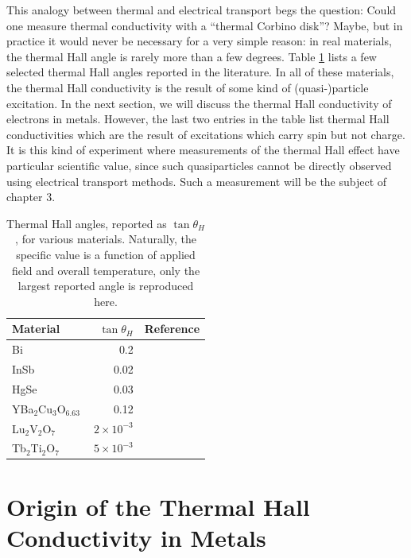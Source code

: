 \documentclass{thesis-umich}
\begin{document}
This analogy between thermal and electrical transport begs the question: Could
one measure thermal conductivity with a ``thermal Corbino disk''? Maybe, but in
practice it would never be necessary for a very simple reason: in real
materials, the thermal Hall angle is rarely more than a few degrees. Table
\ref{tab:hall_angles} lists a few selected thermal Hall angles reported in the
literature. In all of these materials, the thermal Hall conductivity is the
result of some kind of (quasi-)particle excitation. In the next section, we
will discuss the thermal Hall conductivity of electrons in metals. However, the
last two entries in the table list thermal Hall conductivities which are the
result of excitations which carry spin but not charge. It is this kind of
experiment where measurements of the thermal Hall effect have particular
scientific value, since such quasiparticles cannot be directly observed using
electrical transport methods. Such a measurement will be the subject of chapter
3.

\begin{table}
\centering
\label{tab:hall_angles}
\begin{tabular}{l|r|c}
\hline
Material & $\tan \theta_H$ & Reference \\
\hline
Bi & 0.2 & \cite{Kobayashi2012}  \\
InSb & 0.02 & \cite{Mette1963} \\
HgSe & 0.03 & \cite{Whitsett1961} \\
YBa$_2$Cu$_3$O$_{6.63}$ & 0.12 & \cite{Krishana1999} \\
Lu$_2$V$_2$O$_7$ & $2 \times 10^{-3}$ & \cite{Onose2010} \\
Tb$_2$Ti$_2$O$_7$ & $~5 \times 10^{-3}$ & \cite{Hirschberger2015} \\
\hline
\end{tabular}
\caption[Example thermal Hall angles]{Thermal Hall angles, reported as $\tan \theta_H$, for various materials. Naturally, the specific value is a function of applied field and overall temperature, only the largest reported angle is reproduced here.}
\end{table}
\section{Origin of the Thermal Hall Conductivity in Metals}
\end{document}
